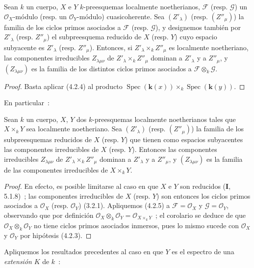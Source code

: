 \begin{proposition}[4.2.5]
\label{IV.2.4.2.5-fr}
Sean $k$ un cuerpo, $X$ e $Y$ $k$-preesquemas localmente noetherianos,
$\mathcal F$ \textup{(resp. $\mathcal G$)} un $\mathcal O_X$-módulo \textup{(resp.} un
$\mathcal O_Y$-módulo\textup{)} cuasicoherente. Sea $(Z'_\lambda)$ \textup{(resp.
$(Z''_\mu)$)} la familia de los ciclos primos asociados a $\mathcal F$ \textup{(resp.
$\mathcal G$)}, y designemos también por $Z'_\lambda$ \textup{(resp. $Z''_\mu$)} el
subpreesquema reducido de $X$ \textup{(resp. $Y$)} cuyo espacio subyacente es
$Z'_\lambda$ \textup{(resp. $Z''_\mu$)}. Entonces, si $Z'_\lambda\times_k Z''_\mu$
es localmente noetheriano, las componentes irreducibles $Z_{\lambda\mu\nu}$
de $Z'_\lambda\times_k Z''_\mu$ dominan a $Z'_\lambda$ y a $Z''_\mu$, y
$(Z_{\lambda\mu\nu})$ es la familia de los distintos ciclos primos asociados a
$\mathcal F\otimes_k\mathcal G$.
\end{proposition}

\begin{proof}
Basta aplicar (4.2.4) al producto
$\operatorname{Spec}(\boldsymbol{k}(x))\times_k\operatorname{Spec}(\boldsymbol{k}(y))$.
\end{proof}

En particular~:

\begin{corollary}[4.2.6]
\label{IV.2.4.2.6-fr}
Sean $k$ un cuerpo, $X$, $Y$ dos $k$-preesquemas localmente noetherianos tales
que $X\times_k Y$ sea localmente noetheriano. Sea $(Z'_\lambda)$ \textup{(resp.
$(Z''_\mu)$)} la familia de los subpreesquemas reducidos de $X$ \textup{(resp. $Y$)} que
tienen como espacios subyacentes las componentes irreducibles de $X$ \textup{(resp.
$Y$)}. Entonces las componentes irreducibles $Z_{\lambda\mu\nu}$ de
$Z'_\lambda\times_k Z''_\mu$ dominan a $Z'_\lambda$ y a $Z''_\mu$, y
$(Z_{\lambda\mu\nu})$ es la familia de las componentes irreducibles de
$X\times_k Y$.
\end{corollary}

\begin{proof}
En efecto, es posible limitarse al caso en que $X$ e $Y$ son reducidos
(\textbf I, 5.1.8)~; las componentes irreducibles de $X$ (resp. $Y$) son entonces los
ciclos primos asociados a $\mathcal O_X$ (resp. $\mathcal O_Y$) (3.2.1). Apliquemos (4.2.5)
a $\mathcal F=\mathcal O_X$ y $\mathcal G=\mathcal O_Y$, observando que por
definición $\mathcal O_X\otimes_k\mathcal O_Y=\mathcal O_{X\times_k Y}$~; el
corolario se deduce de que $\mathcal O_X\otimes_k\mathcal O_Y$ no tiene ciclos
primos asociados inmersos, pues lo mismo sucede con $\mathcal O_X$ y
$\mathcal O_Y$ por hipótesis (4.2.3).
\end{proof}

Apliquemos los resultados precedentes al caso en que $Y$ es el espectro de una
\emph{extensión} $K$ de $k$~:
